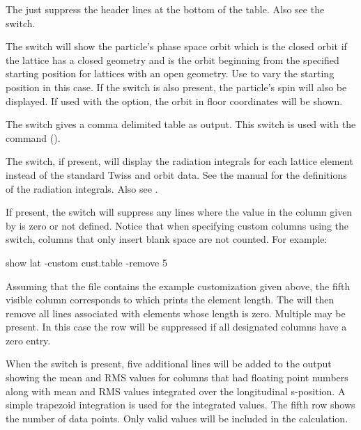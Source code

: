 {{{{{{{{{\begin{description}
The  just suppress the header lines at the bottom of the table. Also see the
 switch.
%
\item[-orbit] \Newline
The  switch will show the particle's phase space orbit which is the closed orbit if the
lattice has a closed geometry and is the orbit beginning from the specified starting position for
lattices with an open geometry. Use  to vary the starting position in this
case. If the  switch is also present, the particle's spin will also be displayed. If used
with the  option, the orbit in floor coordinates will be shown.
%
\item[-pipe] \Newline
The  switch gives a comma delimited table as output. This switch is used with the
 command ().
%
\item[-radiation_integrals] \Newline
The  switch, if present, will display the radiation integrals for each
lattice element instead of the standard Twiss and orbit data. See the \bmad manual for the
definitions of the radiation integrals. Also see .
%
\item[-remove_line_if_zero <column \#>] \Newline
If present, the  switch will suppress any lines where the value
in the column given by  is zero or not defined. Notice that when specifying custom
columns using the  switch, columns that only insert blank space are not counted. For
example:
\begin{example}
  show lat -custom cust.table -remove 5
\end{example}
Assuming that the file  contains the example customization given above, the fifth
visible column corresponds to  which prints the element length. The 
will then remove all lines associated with elements whose length is zero. Multiple
 may be present. In this case the row will be suppressed if all designated
columns have a zero entry.
%
\item[-rms] \Newline
When the  switch is present, five additional lines will be added to the output showing the
mean and RMS values for columns that had floating point numbers along with mean and RMS values
integrated over the longitudinal s-position. A simple trapezoid integration is used for the
integrated values. The fifth row shows the number of data points. Only valid values will be included
in the calculation.

\end{description}}}}}}}}}}
